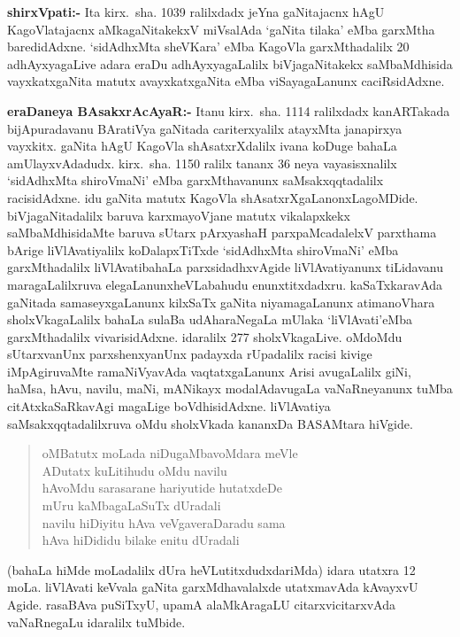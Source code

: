 \textbf{shirxVpati:-} Ita kirx.~sha. {\rm 1039} ralilxdadx jeYna gaNitajacnx hAgU KagoVlatajacnx aMka\-gaNitakekxV miVsalAda `gaNita tilaka' eMba garxMtha baredidAdxne. `sidAdhxMta sheVKara' eMba KagoVla garxMthadalilx {\rm 20} adhAyxyagaLive adara eraDu adhAyxyagaLalilx biVjagaNitakekx saMbaMdhisida vayxkatxgaNita matutx avayxkatxgaNita eMba viSayagaLanunx caciRsidAdxne.

\textbf{eraDaneya BAsakxrAcAyaR:-} Itanu kirx.~sha. {\rm 1114} ralilxdadx kanARTakada bijApuradavanu BAratiVya gaNitada cariterxyalilx atayxMta janapirxya vayxkitx. gaNita hAgU KagoVla shAsatxrXdalilx ivana koDuge bahaLa amUlayxvAdadudx. kirx.~sha. {\rm 1150} ralilx tananx {\rm 36} neya vayasisxnalilx `sidAdhxMta shiroVmaNi' eMba garxMthavanunx saMsakxqqtadalilx racisidAdxne. idu gaNita matutx KagoVla shAsatxrXgaLanonxLagoMDide. biVjagaNitadalilx baruva karxma\-yoVjane matutx vikalapxkekx saMbaMdhisidaMte baruva sUtarx pArxyashaH parxpaMcadalelxV parxthama bArige liVlAvatiyalilx koDalapxTiTxde `sidAdhxMta shiroVmaNi' eMba garxMthadalilx liVlAvati\break bahaLa parxsidadhxvAgide liVlAvatiyanunx tiLidavanu maragaLalilxruva elegaLanunx\break heVLabahudu enunxtitxdadxru. kaSaTxkaravAda gaNitada samaseyxgaLanunx kilxSaTx gaNita niyama\-gaLanunx atimanoVhara sholxVkagaLalilx bahaLa sulaBa udAharaNegaLa mUlaka `liVlAvati'\break eMba garxMthadalilx vivarisidAdxne. idaralilx {\rm 277} sholxVkagaLive. oMdoMdu sUtarxvanUnx parxshenxyanUnx padayxda rUpadalilx racisi kivige iMpAgiruvaMte ramaNiVyavAda vaqtatx\-gaLanunx Arisi avugaLalilx giNi, haMsa, hAvu, navilu, maNi, mANikayx \-modalAdavugaLa vaNaRneyanunx tuMba citAtxkaSaRkavAgi magaLige boVdhisidAdxne. liVlAvatiya saMsakxqqta\-dalilxruva oMdu sholxVkada kananxDa BASAMtara hiVgide.
\begin{verse}
oMBatutx moLada niDugaMbavoMdara meVle\\
ADutatx kuLitihudu oMdu navilu\\
hAvoMdu sarasarane hariyutide hutatxdeDe\\
mUru kaMbagaLaSuTx dUradali\\
navilu hiDiyitu hAva veVgaveraDaradu sama\\
hAva hiDididu bilake enitu dUradali
\end{verse}

(bahaLa hiMde moLadalilx dUra heVLutitxdudxdariMda) idara utatxra {\rm 12} moLa. liVlAvati keVvala gaNita garxMdhavalalxde utatxmavAda kAvayxvU Agide. rasaBAva puSiTxyU, upamA alaMkAragaLU citarxvicitarxvAda vaNaRnegaLu idaralilx tuMbide.

